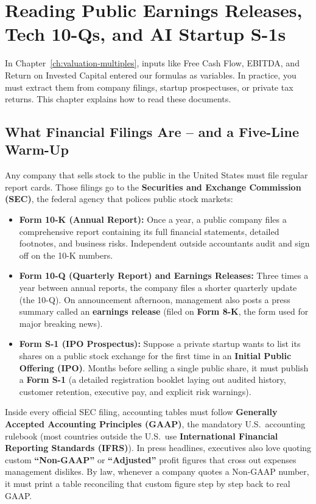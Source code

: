 \chapter{Reading Public Earnings Releases, Tech 10-Qs, and AI Startup S-1s}
\label{ch:filings-and-profitability}
\chapterline

In Chapter~\ref{ch:valuation-multiples}, inputs like Free Cash Flow, EBITDA, and Return on Invested Capital entered our formulas as variables. In practice, you must extract them from company filings, startup prospectuses, or private tax returns. This chapter explains how to read these documents.

\section{What Financial Filings Are -- and a Five-Line Warm-Up}

Any company that sells stock to the public in the United States must file regular report cards. Those filings go to the \textbf{Securities and Exchange Commission (SEC)}, the federal agency that polices public stock markets:
\begin{itemize}
  \item \textbf{Form 10-K (Annual Report):} Once a year, a public company files a comprehensive report containing its full financial statements, detailed footnotes, and business risks. Independent outside accountants audit and sign off on the 10-K numbers.
  \item \textbf{Form 10-Q (Quarterly Report) and Earnings Releases:} Three times a year between annual reports, the company files a shorter quarterly update (the 10-Q). On announcement afternoon, management also posts a press summary called an \textbf{earnings release} (filed on \textbf{Form 8-K}, the form used for major breaking news).
  \item \textbf{Form S-1 (IPO Prospectus):} Suppose a private startup wants to list its shares on a public stock exchange for the first time in an \textbf{Initial Public Offering (IPO)}. Months before selling a single public share, it must publish a \textbf{Form S-1} (a detailed registration booklet laying out audited history, customer retention, executive pay, and explicit risk warnings).
\end{itemize}

Inside every official SEC filing, accounting tables must follow \textbf{Generally Accepted Accounting Principles (GAAP)}, the mandatory U.S.\ accounting rulebook (most countries outside the U.S.\ use \textbf{International Financial Reporting Standards (IFRS)}). In press headlines, executives also love quoting custom \textbf{``Non-GAAP''} or \textbf{``Adjusted''} profit figures that cross out expenses management dislikes. By law, whenever a company quotes a Non-GAAP number, it must print a table reconciling that custom figure step by step back to real GAAP.

